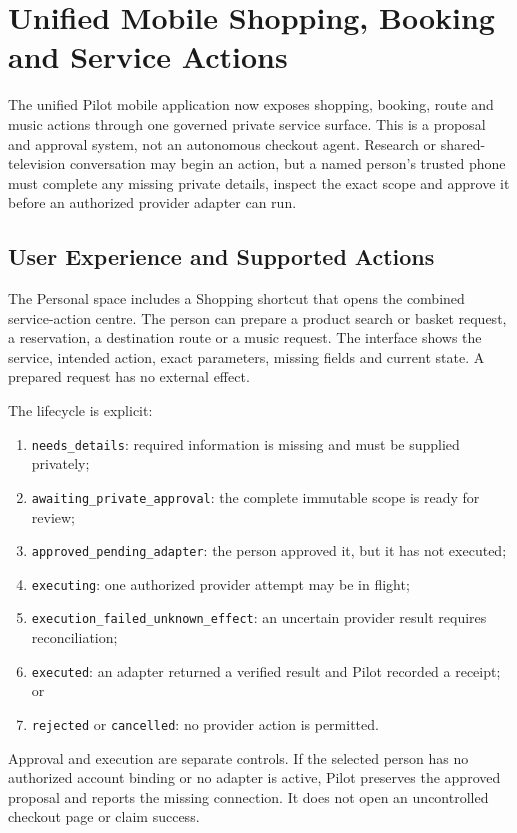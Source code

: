 \section{Unified Mobile Shopping, Booking and Service Actions}
\label{sec:pilot-unified-mobile-service-actions}

The unified Pilot mobile application now exposes shopping, booking, route and music actions through
one governed private service surface.  This is a proposal and approval system, not an autonomous
checkout agent.  Research or shared-television conversation may begin an action, but a named
person's trusted phone must complete any missing private details, inspect the exact scope and
approve it before an authorized provider adapter can run.

\subsection{User Experience and Supported Actions}

The Personal space includes a Shopping shortcut that opens the combined service-action centre.
The person can prepare a product search or basket request, a reservation, a destination route or a
music request.  The interface shows the service, intended action, exact parameters, missing fields
and current state.  A prepared request has no external effect.

The lifecycle is explicit:
\begin{enumerate}
  \item \texttt{needs\_details}: required information is missing and must be supplied privately;
  \item \texttt{awaiting\_private\_approval}: the complete immutable scope is ready for review;
  \item \texttt{approved\_pending\_adapter}: the person approved it, but it has not executed;
  \item \texttt{executing}: one authorized provider attempt may be in flight;
  \item \texttt{execution\_failed\_unknown\_effect}: an uncertain provider result requires reconciliation;
  \item \texttt{executed}: an adapter returned a verified result and Pilot recorded a receipt; or
  \item \texttt{rejected} or \texttt{cancelled}: no provider action is permitted.
\end{enumerate}

Approval and execution are separate controls.  If the selected person has no authorized account
binding or no adapter is active, Pilot preserves the approved proposal and reports the missing
connection.  It does not open an uncontrolled checkout page or claim success.

